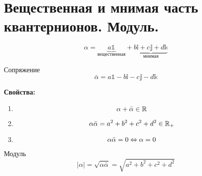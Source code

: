 \section{Вещественная и мнимая часть квантернионов. Модуль.}

$$\alpha=\underbrace{a\mathbb{1}}_{\text{вещественная}}+\underbrace{b\mathbb{i}+c\mathbb{j}+d\mathbb{k}}_{\text{мнимая}}$$
\begin{Def}
Сопряжение
$$\bar\alpha=a\mathbb{1}-b\mathbb{i}-c\mathbb{j}-d\mathbb{k}$$
\end{Def}
{\bf Свойства:}
\begin{enumerate}
\item $$\alpha + \bar\alpha \in \mathbb{R}$$
\item $$\alpha\bar\alpha = a^2 + b^2 + c^2 + d^2 \in \mathbb{R}_+$$
\item $$\alpha\bar\alpha = 0 \Leftrightarrow \alpha = 0$$
\end{enumerate}

\begin{Def}
Модуль
$$|\alpha| = \sqrt{\alpha \bar\alpha} = \sqrt{a^2 + b^2 + c^2 + d^2}$$
\end{Def}